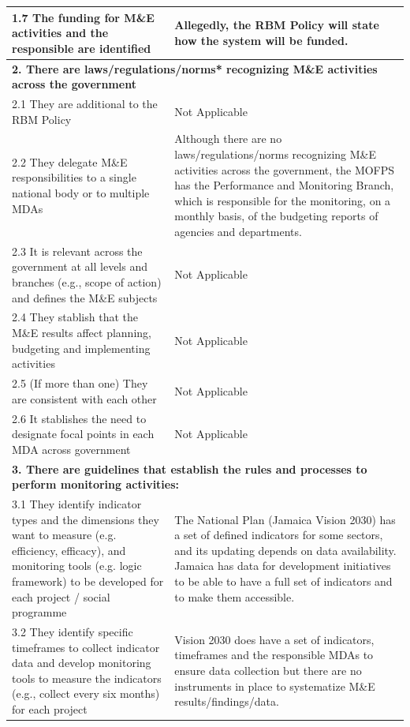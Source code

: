 \documentclass[
  10pt,
]{book}
\begin{document}
\begin{table}
\begin{tabular}[t]{l|l}
\hline
\hspace{1em}1.7 The funding for M\&E activities and the responsible are identified & Allegedly, the RBM Policy will state how the system will be funded.\\
\hline
\multicolumn{2}{l}{\textbf{2. There are laws/regulations/norms* recognizing M\&E activities across the government}}\\
\hline
\hspace{1em}2.1 They are additional to the RBM Policy & Not Applicable\\
\hline
\hspace{1em}2.2 They delegate M\&E responsibilities to a single national body or to multiple MDAs & Although there are no laws/regulations/norms recognizing M\&E activities across the government, the MOFPS has the Performance and Monitoring Branch, which is responsible for the monitoring, on a monthly basis, of the budgeting reports of agencies and departments.\\
\hline
\hspace{1em}2.3 It is relevant across the government at all levels and branches (e.g., scope of action) and defines the M\&E subjects & Not Applicable\\
\hline
\hspace{1em}2.4 They stablish that the M\&E results affect planning, budgeting and implementing activities & Not Applicable\\
\hline
\hspace{1em}2.5 (If more than one) They are consistent with each other & Not Applicable\\
\hline
\hspace{1em}2.6 It stablishes the need to designate focal points in each MDA across government & Not Applicable\\
\hline
\multicolumn{2}{l}{\textbf{3. There are guidelines that establish the rules and processes to perform monitoring activities:}}\\
\hline
\hspace{1em}3.1 They identify indicator types and the dimensions they want to measure (e.g. efficiency, efficacy), and monitoring tools (e.g. logic framework) to be developed for each project / social programme & The National Plan (Jamaica Vision 2030) has a set of defined indicators for some sectors, and its updating depends on data availability. Jamaica has data for development initiatives to be able to have a full set of indicators and to make them accessible.\\
\hline
\hspace{1em}3.2 They identify specific timeframes to collect indicator data and develop monitoring tools to measure the indicators (e.g., collect every six months) for each project & Vision 2030 does have a set of indicators, timeframes and the responsible MDAs to ensure data collection but there are no instruments in place to systematize M\&E results/findings/data.\\

\end{tabular}
\end{table}
\end{document}
